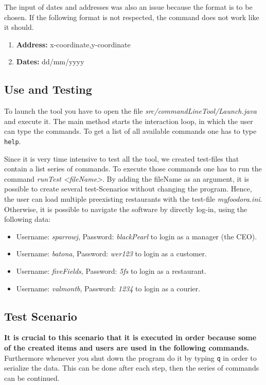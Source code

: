 The input of dates and addresses was also an issue because the format is to be chosen. If the 
following format is not respected, the command does not work like it should.
\begin{enumerate}
	\item \textbf{Address: } x-coordinate,y-coordinate
	\item \textbf{Dates: } dd/mm/yyyy
\end{enumerate}

\subsection{Use and Testing}
\label{sub:use_and_testing}

To launch the tool you have to open the file \textit{src/commandLineTool/Launch.java} and execute
it. The main method starts the interaction loop, in which the user can type the commands. To get
a list of all available commands one has to type \lstinline|help|. 

Since it is very time intensive to test all the tool, we created test-files that
contain a list series of commands. To execute those commands one has to run the command 
\textit{runTest <fileName>}. By adding the fileName as an argument, it is possible to create 
several test-Scenarios without changing the program. Hence, the user can load multiple 
preexisting restaurants with the test-file \textit{my\textunderscore foodora.ini}.
Otherwise, it is possible to navigate the software by directly log-in, using the following data:
\begin{itemize}
	\item{}Username: \textit{sparrowj}, Password: \textit{blackPearl} to login as a manager (the CEO).
	\item{}Username: \textit{batona}, Password: \textit{wer123} to login as a customer.
	\item{}Username: \textit{fiveFields}, Password: \textit{5fs} to login as a restaurant.
	\item{}Username: \textit{valmontb}, Password: \textit{1234} to login as a courier.
\end{itemize}

\subsection{Test Scenario}
\label{sub:test_scenario}

\textbf{It is crucial to this scenario that it is executed in order because some of the created items and 
users are used in the following commands.} Furthermore whenever you shut down the program do it by
typing \lstinline|q| in order to serialize the data. This can be done after each step, then the 
series of commands can be continued.


